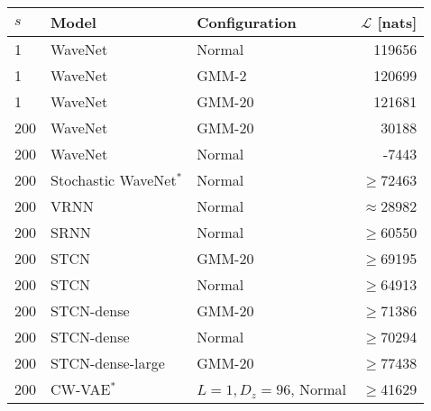 \begin{table}[t!]
    \centering
    \begin{tabular}{lll|r}
        \toprule
        $s$ & \bf Model           & \bf Configuration           & \bf $\mathcal{L}$ [nats] \\
        \midrule
        1 & WaveNet                                                               & Normal & 119656 \\
        1 & WaveNet                                                               & GMM-2  & 120699 \\
        1 & WaveNet                                                               & GMM-20 & 121681 \\
        \midrule
        200 & WaveNet {\scriptsize \cite{aksan_stcn_2019}}                        & GMM-20    & 30188 \\
        200 & WaveNet {\scriptsize \cite{aksan_stcn_2019}}                        & Normal & -7443 \\
        200 & Stochastic WaveNet$^*$ {\scriptsize \cite{lai_stochastic_2018}}     & Normal & $\geq$72463\\
        200 & VRNN {\scriptsize \cite{chung_recurrent_2015}}                      & Normal & $\approx$28982\\
        200 & SRNN {\scriptsize \cite{fraccaro_sequential_2016}}                  & Normal & $\geq$60550 \\
        200 & STCN {\scriptsize \cite{aksan_stcn_2019}}                           & GMM-20 & $\geq$69195\\
        200 & STCN {\scriptsize \cite{aksan_stcn_2019}}                           & Normal & $\geq$64913\\
        200 & STCN-dense {\scriptsize \cite{aksan_stcn_2019}}                     & GMM-20 & $\geq$71386\\
        200 & STCN-dense {\scriptsize \cite{aksan_stcn_2019}}                     & Normal & $\geq$70294\\
        200 & STCN-dense-large {\scriptsize \cite{aksan_stcn_2019}}               & GMM-20 & $\geq$77438\\
        200 & CW-VAE$^*$                                         & $L=1, D_z=96$, Normal & $\geq$41629 \\  %

\end{tabular}
\end{table}
